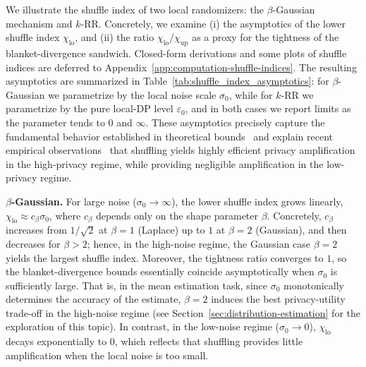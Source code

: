 \documentclass{article}
\theoremstyle{plain}
\theoremstyle{definition}
\begin{document}
We illustrate the shuffle index of two local randomizers: the $\beta$-Gaussian mechanism and $k$-RR. 
Concretely, we examine (i) the asymptotics of the lower shuffle index $\chi_{\mathrm{lo}}$, and (ii) the ratio $\chi_{\mathrm{lo}}/\chi_{\mathrm{up}}$ as a proxy for the tightness of the blanket-divergence sandwich. 
Closed-form derivations and some plots of shuffle indices are deferred to Appendix~\ref{app:computation-shuffle-indices}. 
The resulting asymptotics are summarized in Table~\ref{tab:shuffle_index_asymptotics}: for $\beta$-Gaussian we parametrize by the local noise scale $\sigma_0$, while for $k$-RR we parametrize by the pure local-DP level $\varepsilon_0$, and in both cases we report limits as the parameter tends to $0$ and $\infty$.
These asymptotics precisely capture the fundamental behavior established in theoretical bounds~\cite{erlingssonAmplificationShufflingLocal2019} and explain recent empirical observations~\cite{chenPrivacyAmplificationCompression2023} that shuffling yields highly efficient privacy amplification in the high-privacy regime, while providing negligible amplification in the low-privacy regime.



\textbf{$\beta$-Gaussian.}
For large noise ($\sigma_0\to\infty$), the lower shuffle index grows linearly, $\chi_{\mathrm{lo}}\approx c_\beta\sigma_0$, where $c_\beta$ depends only on the shape parameter $\beta$.
Concretely, $c_\beta$ increases from $1/\sqrt{2}$ at $\beta=1$ (Laplace) up to $1$ at $\beta=2$ (Gaussian), and then decreases for $\beta>2$; hence, in the high-noise regime, the Gaussian case $\beta=2$ yields the largest shuffle index.
Moreover, the tightness ratio converges to $1$, so the blanket-divergence bounds essentially coincide asymptotically when $\sigma_0$ is sufficiently large.
That is, in the mean estimation task, since $\sigma_0$ monotonically determines the accuracy of the estimate, $\beta=2$ induces the best privacy-utility trade-off in the high-noise regime (see Section~\ref{sec:distribution-estimation} for the exploration of this topic).
In contrast, in the low-noise regime ($\sigma_0\to 0$), $\chi_{\mathrm{lo}}$ decays exponentially to $0$, which reflects that shuffling provides little amplification when the local noise is too small.
\end{document}
